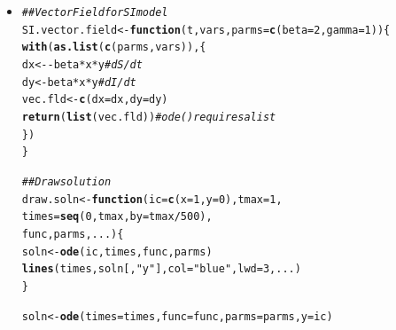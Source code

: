 \documentclass[12pt]{article}\usepackage[]{graphicx}\usepackage[]{color}
\makeatletter
\newcommand{\hlnum}[1]{\textcolor[rgb]{0.686,0.059,0.569}{#1}}%
\newcommand{\hlstr}[1]{\textcolor[rgb]{0.192,0.494,0.8}{#1}}%
\newcommand{\hlcom}[1]{\textcolor[rgb]{0.678,0.584,0.686}{\textit{#1}}}%
\newcommand{\hlopt}[1]{\textcolor[rgb]{0,0,0}{#1}}%
\newcommand{\hlstd}[1]{\textcolor[rgb]{0.345,0.345,0.345}{#1}}%
\newcommand{\hlkwa}[1]{\textcolor[rgb]{0.161,0.373,0.58}{\textbf{#1}}}%
\newcommand{\hlkwb}[1]{\textcolor[rgb]{0.69,0.353,0.396}{#1}}%
\newcommand{\hlkwc}[1]{\textcolor[rgb]{0.333,0.667,0.333}{#1}}%
\newcommand{\hlkwd}[1]{\textcolor[rgb]{0.737,0.353,0.396}{\textbf{#1}}}%
\newenvironment{kframe}{%
 \def\at@end@of@kframe{}%
 \ifinner\ifhmode%
  \def\at@end@of@kframe{\end{minipage}}%
  \begin{minipage}{\columnwidth}%
 \fi\fi%
 \def\FrameCommand##1{\hskip\@totalleftmargin \hskip-\fboxsep
 \colorbox{shadecolor}{##1}\hskip-\fboxsep
     \hskip-\linewidth \hskip-\@totalleftmargin \hskip\columnwidth}%
 \MakeFramed {\advance\hsize-\width
   \@totalleftmargin\z@ \linewidth\hsize
   \@setminipage}}%
 {\par\unskip\endMakeFramed%
 \at@end@of@kframe}
\newenvironment{knitrout}{}{} %
\makeatother
\begin{document}
\begin{enumerate}[(a)]
\begin{itemize}
\begin{knitrout}
\end{knitrout}
  \item \FitSIRbiiiA
\begin{knitrout}
\color{fgcolor}\begin{kframe}
\begin{alltt}
\hlcom{## Vector Field for SI model}
\hlstd{SI.vector.field} \hlkwb{<-} \hlkwa{function}\hlstd{(}\hlkwc{t}\hlstd{,} \hlkwc{vars}\hlstd{,} \hlkwc{parms}\hlstd{=}\hlkwd{c}\hlstd{(}\hlkwc{beta}\hlstd{=}\hlnum{2}\hlstd{,}\hlkwc{gamma}\hlstd{=}\hlnum{1}\hlstd{)) \{}
  \hlkwd{with}\hlstd{(}\hlkwd{as.list}\hlstd{(}\hlkwd{c}\hlstd{(parms, vars)), \{}
    \hlstd{dx} \hlkwb{<-} \hlopt{-}\hlstd{beta}\hlopt{*}\hlstd{x}\hlopt{*}\hlstd{y} \hlcom{# dS/dt}
    \hlstd{dy} \hlkwb{<-} \hlstd{beta}\hlopt{*}\hlstd{x}\hlopt{*}\hlstd{y}  \hlcom{# dI/dt}
    \hlstd{vec.fld} \hlkwb{<-} \hlkwd{c}\hlstd{(}\hlkwc{dx}\hlstd{=dx,} \hlkwc{dy}\hlstd{=dy)}
    \hlkwd{return}\hlstd{(}\hlkwd{list}\hlstd{(vec.fld))} \hlcom{# ode() requires a list}
  \hlstd{\})}
\hlstd{\}}
\end{alltt}
\end{kframe}
\end{knitrout}

\FitSIRbiiiB
\begin{knitrout}
\color{fgcolor}\begin{kframe}
\begin{alltt}
\hlcom{## Draw solution}
\hlstd{draw.soln} \hlkwb{<-} \hlkwa{function}\hlstd{(}\hlkwc{ic}\hlstd{=}\hlkwd{c}\hlstd{(}\hlkwc{x}\hlstd{=}\hlnum{1}\hlstd{,}\hlkwc{y}\hlstd{=}\hlnum{0}\hlstd{),} \hlkwc{tmax}\hlstd{=}\hlnum{1}\hlstd{,}
                      \hlkwc{times}\hlstd{=}\hlkwd{seq}\hlstd{(}\hlnum{0}\hlstd{,tmax,}\hlkwc{by}\hlstd{=tmax}\hlopt{/}\hlnum{500}\hlstd{),}
                      \hlkwc{func}\hlstd{,} \hlkwc{parms}\hlstd{,} \hlkwc{...} \hlstd{) \{}
  \hlstd{soln} \hlkwb{<-} \hlkwd{ode}\hlstd{(ic, times, func, parms)}
  \hlkwd{lines}\hlstd{(times, soln[,}\hlstr{"y"}\hlstd{],} \hlkwc{col}\hlstd{=}\hlstr{"blue"}\hlstd{,} \hlkwc{lwd}\hlstd{=}\hlnum{3}\hlstd{, ... )}
\hlstd{\}}
\end{alltt}
\end{kframe}
\end{knitrout}
\FitSIRbiiiC
\begin{knitrout}
\color{fgcolor}\begin{kframe}
\begin{alltt}
  \hlstd{soln} \hlkwb{<-} \hlkwd{ode}\hlstd{(}\hlkwc{times}\hlstd{=times,} \hlkwc{func}\hlstd{=func,} \hlkwc{parms}\hlstd{=parms,} \hlkwc{y}\hlstd{=ic)}
\end{alltt}
\end{kframe}
\end{knitrout}


\end{itemize}
\end{enumerate}
\end{document}
